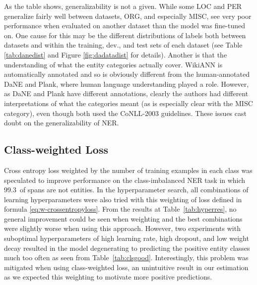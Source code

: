 \documentclass[main.tex]{subfiles}
\begin{document}
As the table shows, generalizability is not a given.
While some LOC and PER generalize fairly well between datasets, ORG, and especially MISC, see very poor performance when evaluated on another dataset than the model was fine-tuned on.
One cause for this may be the different distributions of labels both between datasets and within the training, dev., and test sets of each dataset (see Table \ref{tab:danedist} and Figure \ref{fig:dadatadist} for details).
Another is that the understanding of what the entity categories actually cover.
WikiANN is automatically annotated and so is obviously different from the human-annotated DaNE and Plank, where human language understanding played a role.
However, as DaNE and Plank have different annotations, clearly the authors had different interpretations of what the categories meant (as is especially clear with the MISC category), even though both used the CoNLL-2003 guidelines.
These issues cast doubt on the generalizability of NER.
\cite{hvingelby2020dane, plank2019neural, pan2017wikiann, tjang2003conll}

\subsection{Class-weighted Loss}
\label{subsec:lossexp}
Cross entropy loss weighted by the number of training examples in each class was speculated to improve performance on the class-imbalanced NER task in which 99.3\pro\ of spans are not entities.
In the hyperparameter search, all combinations of learning hyperparameters were also tried with this weighting of loss defined in formula \eqref{eq:w-crossentropyloss}.
From the results at Table~\ref{tab:hyperres}, no general improvement could be seen when weighting and the best combinations were slightly worse when using this approach.
However, two experiments with suboptimal hyperparameters of high learning rate, high dropout, and low weight decay resulted in the model degenerating to predicting the positive entity classes much too often as seen from Table~\ref{tab:clsgood}.
Interestingly, this problem was mitigated when using class-weighted loss, an unintuitive result in our estimation as we expected this weighting to motivate more positive predictions.
\end{document}
